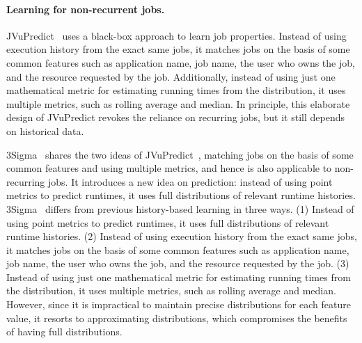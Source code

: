 

\paragraph{Learning for non-recurrent jobs.}
JVuPredict~\cite{jamiasvu} uses a black-box approach to learn
job properties. Instead of using execution history from the exact same jobs,
it matches jobs on the basis of some common features such as application name,
job name, the user who owns the job, and the resource requested by the job.
Additionally, instead of using just one mathematical metric for estimating
running times from the distribution, it uses multiple metrics, such as rolling
average and median. In principle, this elaborate design of JVuPredict 
revokes the reliance on recurring jobs, but it still depends on historical data.

3Sigma~\cite{3Sigma} shares the two ideas of
JVuPredict~\cite{jamiasvu}, \ie matching jobs on the basis of some
common features and using multiple metrics,
and hence is also applicable to non-recurring jobs.
It introduces a new idea on prediction: instead of using point
metrics to predict runtimes, it uses full distributions of relevant
runtime histories.
3Sigma~\cite{3Sigma} differs from previous history-based learning in three ways.
(1) Instead of using point metrics to predict runtimes, it uses full
distributions of relevant runtime histories.
(2) Instead of using execution history from the
exact same jobs, it matches jobs on the basis of some common features such as
application name, job name, the user who owns the job, and the resource requested by the
job.
%
(3) Instead of using just one mathematical metric for
estimating running times from the distribution, it uses multiple metrics, such as
rolling average and median.
\fi
However, since it is impractical to maintain precise distributions for each
feature value, it resorts to approximating distributions, which
compromises the benefits of having full distributions. 

